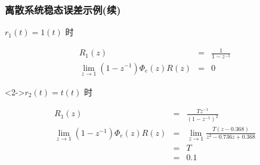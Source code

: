 \documentclass[table]{beamer}
\begin{document}
\begin{frame}
\frametitle{离散系统稳态误差示例(续)}
\label{sec-1-3}
\begin{block}{$r_1(t) =  1(t)$ 时}
\label{sec-1-3-1}

     \begin{eqnarray*}
     R_1(z) &=& \frac{1}{1-z^{-1}} \\
     \lim_{z\rightarrow 1}(1-z^{-1})\Phi_e(z)R(z) &=& 0
     \end{eqnarray*}
\end{block}
\begin{block}<2->{$r_2(t) = t(t)$ 时}
\label{sec-1-3-2}

     \begin{eqnarray*}
     R_1(z) &=& \frac{Tz^{-1}}{(1-z^{-1})^2} \\
     \lim_{z\rightarrow 1}(1-z^{-1})\Phi_e(z)R(z) &=& \lim_{z\rightarrow 1}\frac{T(z-0.368)}{z^2-0.736z+0.368}\\
      &=& T \\
      &=& 0.1
     \end{eqnarray*}
\end{block}
\end{frame}
\end{document}

